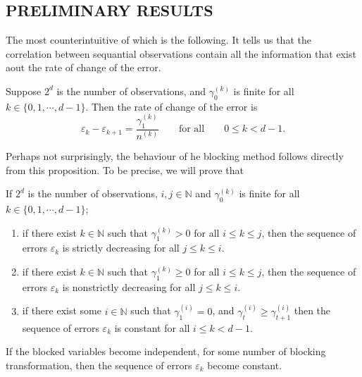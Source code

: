 \documentclass[11pt,english,a4paper]{article}
\begin{document}
\subsection*{\uppercase{Preliminary results}}
The most counterintuitive of which is the following. It tells us that the correlation between sequantial observations contain all the information that exist aout the rate of change of the error.
\begin{prop}
Suppose $2^d$ is the number of observations, and $\gamma^{(k)}_0$ is finite for all $k \in \{ 0,1,\cdots, d-1 \}$. Then the rate of change of the error is
\begin{equation}
\varepsilon_k - \varepsilon_{  k+1} = \frac{\gamma_1^{(k)} }{n^{(k)}} \qquad \text{for all} \qquad 0 \leq k < d-1 \label{eq:rate}.
\end{equation}
\label{prop:diff}
\end{prop}
Perhaps not surprisingly, the behaviour of he blocking method follows directly from this proposition. To be precise, we will prove that
\begin{corollary}
If $2^d$ is the number of observations, $i,j\in \mathbb{N}$ and $\gamma^{(k)}_0$ is finite for all $k \in \{ 0,1,\cdots, d-1 \}$;
\begin{enumerate}
\item if there exist $k \in \mathbb{N}$ such that $\gamma^{(k)}_1 > 0$ for all $i \leq k \leq j$, then the sequence of errors $\varepsilon_k$ is strictly decreasing for all $j \leq k \leq i$.
\item if there exist $k \in \mathbb{N}$ such that $\gamma^{(k)}_1 \geq 0$ for all $i \leq k \leq j$, then the sequence of errors $\varepsilon_k$ is nonstrictly decreasing for all $j \leq k \leq i$.
\item if there exist some $i \in \mathbb{N}$ such that $\gamma^{(i)}_1 = 0$, and $\gamma^{(i)}_t \geq \gamma^{(i)}_{t+1}$ then the sequence of errors $\varepsilon_k$ is constant for all $i \leq k < d-1$.
\end{enumerate}
\end{corollary}
\begin{corollary}
If the blocked variables become independent, for some number of blocking transformation, then the sequence of errors $\varepsilon_k$ become constant.
\end{corollary}
\end{document}

